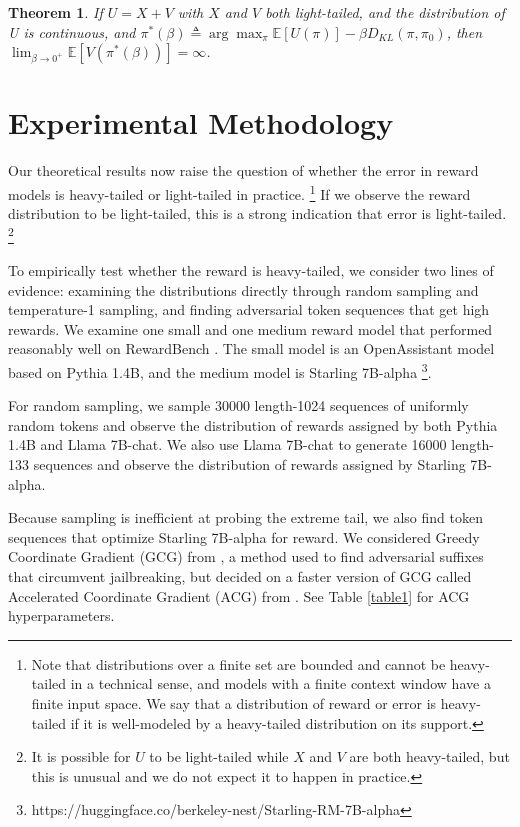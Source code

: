 \documentclass{article}
\theoremstyle{plain}
\newtheorem{theorem}{Theorem}
\theoremstyle{definition}
\theoremstyle{remark}
\begin{document}
\begin{theorem}
\label{thm4} If \(U=X+V\) with \(X\) and \(V\) both
light-tailed, and the distribution of U is continuous, and
\(\pi^*(\beta) \triangleq \arg \max_\pi \mathbb E[U(\pi)] - \beta D_{KL}(\pi, \pi_0)\),
then \(\lim_{\beta \to 0^+} \mathbb E[V(\pi^*(\beta))] = \infty\).
\end{theorem}

\section{Experimental Methodology}

Our theoretical results now raise the question of whether the error in reward models is heavy-tailed or light-tailed in practice. \footnote{Note that distributions over a finite set are bounded and cannot be heavy-tailed in a technical sense, and models with a finite context window have a finite input space. We say that a distribution of reward or error is heavy-tailed if it is well-modeled by a heavy-tailed distribution on its support.} If we observe the reward distribution to be light-tailed, this is a strong indication that error is light-tailed. \footnote{It is possible for $U$ to be light-tailed while $X$ and $V$ are both heavy-tailed, but this is unusual and we do not expect it to happen in practice.}

To empirically test whether the reward is heavy-tailed, we consider two lines of evidence: examining the distributions directly through random sampling and temperature-1 sampling, and finding adversarial token sequences that get high rewards. We examine one small and one medium reward model that performed reasonably well on RewardBench \citep{lambert2023rewardbench}. The small model is an OpenAssistant model based on Pythia 1.4B, and the medium model is Starling 7B-alpha \citep{starling2023}\footnote{https://huggingface.co/berkeley-nest/Starling-RM-7B-alpha}.

For random sampling, we sample 30000 length-1024 sequences of uniformly random tokens and observe the distribution of rewards assigned by both Pythia 1.4B and Llama 7B-chat. We also use Llama 7B-chat to generate 16000 length-133 sequences and observe the distribution of rewards assigned by Starling 7B-alpha.

Because sampling is inefficient at probing the extreme tail, we also find token sequences that optimize Starling 7B-alpha for reward. We considered Greedy Coordinate Gradient (GCG) from \citep{zou2023universal}, a method used to find adversarial suffixes that circumvent jailbreaking, but decided on a faster version of GCG called Accelerated Coordinate Gradient (ACG) from \citep{haizelabs2024acg}. See Table \ref{table1} for ACG hyperparameters.
\end{document}
